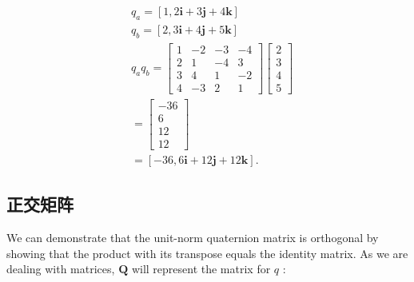     $$
        \begin{aligned}
             & q_{a}=[1,2 \mathbf{i}+3 \mathbf{j}+4 \mathbf{k}]                                           \\
             & q_{b}=[2,3 \mathbf{i}+4 \mathbf{j}+5 \mathbf{k}]                                           \\
             & q_{a} q_{b}=\left[\begin{array}{rrrr}
                    1 & -2 & -3 & -4 \\
                    2 & 1  & -4 & 3  \\
                    3 & 4  & 1  & -2 \\
                    4 & -3 & 2  & 1
                \end{array}\right]\left[\begin{array}{l}
                    2 \\
                    3 \\
                    4 \\
                    5
                \end{array}\right] \\
             & =\left[\begin{array}{r}
                    -36 \\
                    6   \\
                    12  \\
                    12
                \end{array}\right]                                                   \\
             & =[-36,6 \mathbf{i}+12 \mathbf{j}+12 \mathbf{k}] \text {. }
        \end{aligned}
    $$

    \subsection{正交矩阵}
    We can demonstrate that the unit-norm quaternion matrix is orthogonal by showing that the product with its transpose equals the identity matrix. As we are dealing with matrices, $\mathbf{Q}$ will represent the matrix for $q$ :

